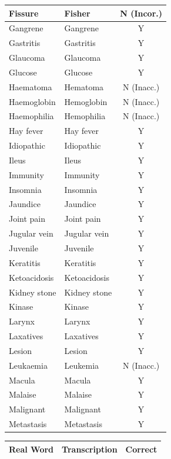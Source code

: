 \begin{table}[H]
\begin{minipage}[t]{0.48\textwidth}
\begin{tabular}{|l|l|c|}
Fissure & Fisher & N (Incor.) \\ \hline
Gangrene & Gangrene & Y \\ \hline
Gastritis & Gastritis & Y \\ \hline
Glaucoma & Glaucoma & Y \\ \hline
Glucose & Glucose & Y \\ \hline
Haematoma & Hematoma & N (Inacc.) \\ \hline
Haemoglobin & Hemoglobin & N (Inacc.) \\ \hline
Haemophilia & Hemophilia & N (Inacc.) \\ \hline
Hay fever & Hay fever & Y \\ \hline
Idiopathic & Idiopathic & Y \\ \hline
Ileus & Ileus & Y \\ \hline
Immunity & Immunity & Y \\ \hline
Insomnia & Insomnia & Y \\ \hline
Jaundice & Jaundice & Y \\ \hline
Joint pain & Joint pain & Y \\ \hline
Jugular vein & Jugular vein & Y \\ \hline
Juvenile & Juvenile & Y \\ \hline
Keratitis & Keratitis & Y \\ \hline
Ketoacidosis & Ketoacidosis & Y \\ \hline
Kidney stone & Kidney stone & Y \\ \hline
Kinase & Kinase & Y \\ \hline
Larynx & Larynx & Y \\ \hline
Laxatives & Laxatives & Y \\ \hline
Lesion & Lesion & Y \\ \hline
Leukaemia & Leukemia & N (Inacc.) \\ \hline
Macula & Macula & Y \\ \hline
Malaise & Malaise & Y \\ \hline
Malignant & Malignant & Y \\ \hline
Metastasis & Metastasis & Y \\ \hline
\end{tabular}
\end{minipage}\hfill
\begin{minipage}[t]{0.48\textwidth}
\centering
\begin{tabular}{|l|l|c|}
\hline
\textbf{Real Word} & \textbf{Transcription} & \textbf{Correct} \\ \hline

\end{tabular}
\end{minipage}
\end{table}
